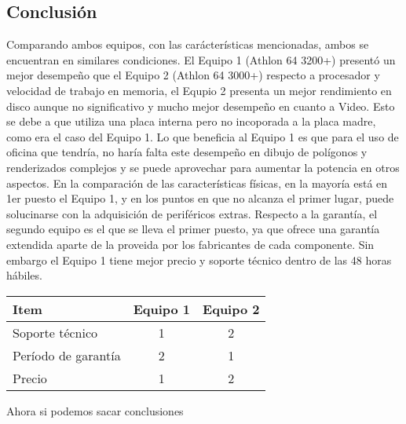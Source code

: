 \subsection{Conclusión}
Comparando ambos equipos, con las carácterísticas mencionadas, ambos se 
encuentran en similares condiciones.
El Equipo 1 (Athlon 64 3200+) presentó un mejor desempeño que el Equipo 2 
(Athlon 64 3000+) respecto a procesador y velocidad de trabajo en memoria,
el Equpio 2 presenta un mejor rendimiento en disco aunque no significativo
y mucho mejor desempeño en cuanto a Video.
Esto se debe a que utiliza una placa interna pero no incoporada a la placa
madre, como era el caso del Equipo 1.
Lo que beneficia al Equipo 1 es que para el uso de oficina que tendría, no
haría falta este desempeño en dibujo de polígonos y renderizados complejos
y se puede aprovechar para aumentar la potencia en otros aspectos.
En la comparación de las características físicas, en la mayoría está en 1er 
puesto el Equipo 1, y en los puntos en que no alcanza el primer lugar, puede 
solucinarse con la adquisición de periféricos extras.
Respecto a la garantía, el segundo equipo es el que se lleva el primer puesto, 
ya que ofrece una garantía extendida aparte de la proveida por los fabricantes 
de cada componente. Sin embargo el Equipo 1 tiene mejor precio y soporte 
técnico dentro de las 48 horas hábiles.

\begin{center}
\begin{tabular}{|lcc|} \hline
\footnotesize\textbf{Item} & \footnotesize\textbf{Equipo 1} & \footnotesize\textbf{Equipo 2} \\\hline
Soporte técnico & 1 & 2 \\\hline
Período de garantía & 2 & 1 \\\hline
Precio & 1 & 2 \\\hline
\end{tabular}
\end{center}

Ahora si podemos sacar conclusiones

